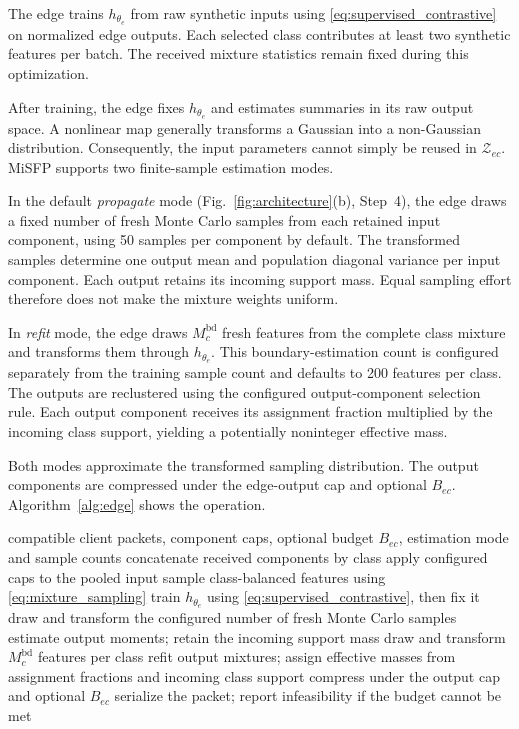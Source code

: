 The edge trains $h_{\theta_e}$ from raw synthetic
inputs using \eqref{eq:supervised_contrastive}
on normalized edge outputs.
Each selected class contributes at least two synthetic
features per batch.
The received mixture statistics remain fixed
during this optimization.

After training, the edge fixes $h_{\theta_e}$
and estimates summaries in its raw output space.
A nonlinear map generally transforms a Gaussian
into a non-Gaussian distribution.
Consequently, the input parameters cannot simply
be reused in $\mathcal Z_{ec}$.
MiSFP supports two finite-sample estimation modes.

In the default \emph{propagate} mode
(Fig.~\ref{fig:architecture}(b), Step~4),
the edge draws a fixed number of fresh Monte Carlo
samples from each retained input component,
using 50 samples per component by default.
The transformed samples determine one output mean
and population diagonal variance per input component.
Each output retains its incoming support mass.
Equal sampling effort therefore does not make
the mixture weights uniform.

In \emph{refit} mode, the edge draws
$M_c^{\mathrm{bd}}$ fresh features from the complete
class mixture and transforms them through $h_{\theta_e}$.
This boundary-estimation count is configured separately
from the training sample count and defaults to
200 features per class.
The outputs are reclustered using the configured
output-component selection rule.
Each output component receives its assignment fraction
multiplied by the incoming class support, yielding
a potentially noninteger effective mass.

Both modes approximate the transformed sampling
distribution.
The output components are compressed under
the edge-output cap and optional $B_{ec}$.
Algorithm~\ref{alg:edge} shows the operation.

\begin{algorithm}[t]
\caption{Edge receive--train--emit operation}
\label{alg:edge}
\begin{algorithmic}[1]
\Require compatible client packets, component caps,
         optional budget $B_{ec}$, estimation mode
         and sample counts
\State concatenate received components by class
\State apply configured caps to the pooled input
\State sample class-balanced features using
       \eqref{eq:mixture_sampling}
\State train $h_{\theta_e}$ using
       \eqref{eq:supervised_contrastive}, then fix it
        \State draw and transform the configured
               number of fresh Monte Carlo samples
        \State estimate output moments;
               retain the incoming support mass
    \EndFor
\Else
    \State draw and transform
           $M_c^{\mathrm{bd}}$ features per class
    \State refit output mixtures; assign effective
           masses from assignment fractions
           and incoming class support
\EndIf
\State compress under the output cap and optional $B_{ec}$
\State serialize the packet; report infeasibility
       if the budget cannot be met
\end{algorithmic}
\end{algorithm}

